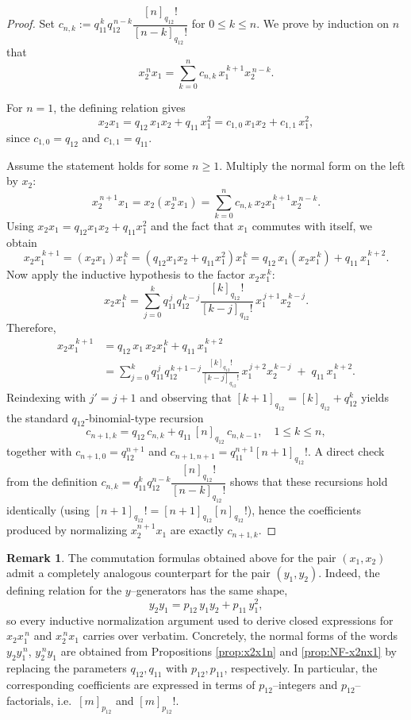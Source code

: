 \documentclass{amsart}
\theoremstyle{definition}
\newtheorem{remark}[theorem]{Remark}
\theoremstyle{remark}
\numberwithin{equation}{section}
\begin{document}
\begin{proof}
Set $c_{n,k}:=q_{11}^{\,k}q_{12}^{\,n-k}\dfrac{[n]_{q_{12}}!}{[n-k]_{q_{12}}!}$ for $0\le k\le n$.
We prove by induction on $n$ that
\[
x_2^{\,n}x_1=\sum_{k=0}^{n} c_{n,k}\,x_1^{\,k+1}x_2^{\,n-k}.
\]

For $n=1$, the defining relation gives
\[
x_2x_1 = q_{12}\,x_1x_2 + q_{11}\,x_1^2
= c_{1,0}\,x_1x_2 + c_{1,1}\,x_1^2,
\]
since $c_{1,0}=q_{12}$ and $c_{1,1}=q_{11}$.

Assume the statement holds for some $n\ge1$. Multiply the normal form on the left by $x_2$:
\[
x_2^{\,n+1}x_1
= x_2(x_2^{\,n}x_1)
= \sum_{k=0}^{n} c_{n,k}\,x_2x_1^{\,k+1}x_2^{\,n-k}.
\]
Using $x_2x_1 = q_{12}x_1x_2 + q_{11}x_1^2$ and the fact that $x_1$ commutes with itself, we obtain
\[
x_2x_1^{\,k+1}
= (x_2x_1)x_1^{\,k}
= (q_{12}x_1x_2+q_{11}x_1^2)x_1^{\,k}
= q_{12}\,x_1(x_2x_1^{\,k}) + q_{11}\,x_1^{\,k+2}.
\]
Now apply the inductive hypothesis to the factor $x_2x_1^{\,k}$:
\[
x_2x_1^{\,k}
=
\sum_{j=0}^{k} q_{11}^{\,j}q_{12}^{\,k-j}\frac{[k]_{q_{12}}!}{[k-j]_{q_{12}}!}\,x_1^{\,j+1}x_2^{\,k-j}.
\]
Therefore,
\begin{align*}
x_2x_1^{\,k+1}
&=
q_{12}\,x_1\,x_2x_1^{\,k} + q_{11}\,x_1^{\,k+2}\\
&=
\sum_{j=0}^{k} q_{11}^{\,j}q_{12}^{\,k+1-j}\frac{[k]_{q_{12}}!}{[k-j]_{q_{12}}!}\,x_1^{\,j+2}x_2^{\,k-j}
\;+\; q_{11}\,x_1^{\,k+2}.
\end{align*}
Reindexing with $j'=j+1$ and observing that $[k+1]_{q_{12}}=[k]_{q_{12}}+q_{12}^{k}$ yields the standard $q_{12}$-binomial-type recursion
\[
c_{n+1,k}=q_{12}\,c_{n,k}+q_{11}\,[n]_{q_{12}}\,c_{n,k-1}, \quad 1\le k\le n,
\]
together with $c_{n+1,0}=q_{12}^{n+1}$ and $c_{n+1,n+1}=q_{11}^{n+1}[n+1]_{q_{12}}!$.
A direct check from the definition $c_{n,k}=q_{11}^{k}q_{12}^{n-k}\dfrac{[n]_{q_{12}}!}{[n-k]_{q_{12}}!}$
shows that these recursions hold identically (using $[n+1]_{q_{12}}!=[n+1]_{q_{12}}[n]_{q_{12}}!$),
hence the coefficients produced by normalizing $x_2^{n+1}x_1$ are exactly $c_{n+1,k}$.
\end{proof}

\begin{remark}\label{rem:q-to-p-y-relations}
The commutation formulas obtained above for the pair $(x_1,x_2)$ admit a completely analogous counterpart for the pair $(y_1,y_2)$. Indeed, the defining relation for the $y$--generators has the same shape,
\[
y_2y_1=p_{12}\,y_1y_2+p_{11}\,y_1^2,
\]
so every inductive normalization argument used to derive closed expressions for $x_2x_1^{\,n}$ and $x_2^{\,n}x_1$ carries over verbatim. Concretely, the normal forms of the words $y_2y_1^{\,n}$, $y_2^{\,n}y_1$ are obtained from Propositions \ref{prop:x2x1n} and \ref{prop:NF-x2nx1} by replacing the parameters $q_{12},q_{11}$ with $p_{12},p_{11}$, respectively. In particular, the corresponding coefficients are expressed in terms of $p_{12}$--integers and $p_{12}$--factorials, i.e.\ $[m]_{p_{12}}$ and $[m]_{p_{12}}!$.
\end{remark}
\end{document}

